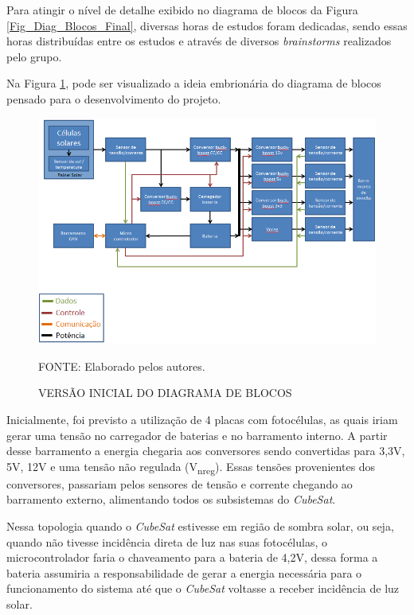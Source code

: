 \documentclass[
	12pt,				%
	openright,			%
	oneside,			%
	a4paper,			%
	english,			%
	french,				%
	spanish,			%
	brazil,				%
	oldfontcommands
	]{abntex2}
\begin{document}
	Para atingir o nível de detalhe exibido no diagrama de blocos da Figura \ref{Fig_Diag_Blocos_Final}, diversas horas de estudos foram dedicadas, sendo essas horas distribuídas entre os estudos e através de diversos \textit{brainstorms} realizados pelo grupo.
	
	Na Figura \ref{Fig_Diag_Blocos_Inicial}, pode ser visualizado a ideia embrionária do diagrama de blocos pensado para o desenvolvimento do projeto.
		
	\begin{figure}[th]
		\caption{VERSÃO INICIAL DO DIAGRAMA DE BLOCOS}
		\label{Fig_Diag_Blocos_Inicial}
		\centering
		\includegraphics[width=1.0\linewidth]{./figs/diag_blocos_inicial}
			
		\begin{small}
			FONTE: Elaborado pelos autores.
		\end{small}		
	\end{figure}	
	\pagebreak

	Inicialmente, foi previsto a utilização de 4 placas com fotocélulas, as quais iriam gerar uma tensão no carregador de baterias e no barramento interno. A partir desse barramento a energia chegaria aos conversores sendo convertidas para 3,3V, 5V, 12V e uma tensão não regulada (V\textsubscript{nreg}). Essas tensões provenientes dos conversores, passariam pelos sensores de tensão e corrente chegando ao barramento externo, alimentando todos os subsistemas do \textit{CubeSat}.
	
	Nessa topologia quando o \textit{CubeSat} estivesse em região de sombra solar, ou seja, quando não tivesse incidência direta de luz nas suas fotocélulas, o microcontrolador faria o chaveamento para a bateria de 4,2V, dessa forma a bateria assumiria a responsabilidade de gerar a energia necessária para o funcionamento do sistema até que o \textit{CubeSat} voltasse a receber incidência de luz solar.
	
\end{document}
